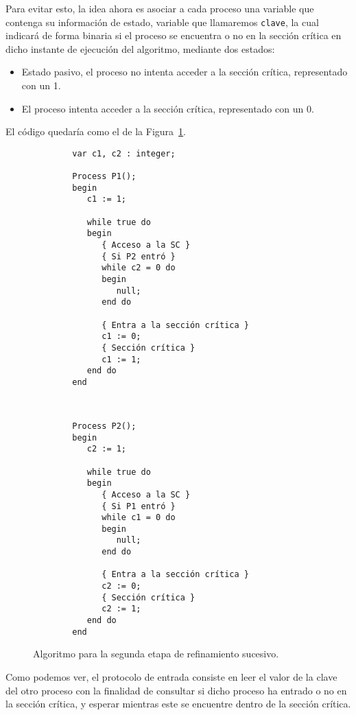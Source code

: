 Para evitar esto, la idea ahora es asociar a cada proceso una variable que contenga su información de estado, variable que llamaremos \verb|clave|, la cual indicará de forma binaria si el proceso se encuentra o no en la sección crítica en dicho instante de ejecución del algoritmo, mediante dos estados:
\begin{itemize}
    \item Estado pasivo, el proceso no intenta acceder a la sección crítica, representado con un 1.
    \item El proceso intenta acceder a la sección crítica, representado con un 0.
\end{itemize}
El código quedaría como el de la Figura~\ref{fig:cod_segunda_etapa}.\\
\begin{figure}
    \centering
\setlength{\columnsep}{1cm}
\begin{multicols}{2}
    \begin{verbatim}
        var c1, c2 : integer;
    
        Process P1();
        begin
           c1 := 1;
    
           while true do
           begin
              { Acceso a la SC }
              { Si P2 entró }
              while c2 = 0 do   
              begin
                 null;
              end do
    
              { Entra a la sección crítica }
              c1 := 0;
              { Sección crítica }
              c1 := 1;
           end do
        end
    \end{verbatim}
    \begin{verbatim}

    
        Process P2();
        begin
           c2 := 1;
    
           while true do
           begin
              { Acceso a la SC }
              { Si P1 entró }
              while c1 = 0 do
              begin
                 null;
              end do
    
              { Entra a la sección crítica }
              c2 := 0;
              { Sección crítica }
              c2 := 1;
           end do
        end
    \end{verbatim}
\end{multicols}
\caption{Algoritmo para la segunda etapa de refinamiento sucesivo.}
\label{fig:cod_segunda_etapa}
\end{figure}
Como podemos ver, el protocolo de entrada consiste en leer el valor de la clave del otro proceso con la finalidad de consultar si dicho proceso ha entrado o no en la sección crítica, y esperar mientras este se encuentre dentro de la sección crítica.\\

